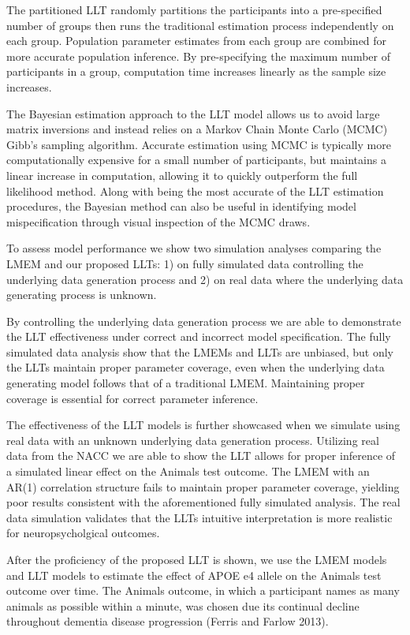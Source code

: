\documentclass[
]{article}
\begin{document}
The partitioned LLT randomly partitions the participants into a pre-specified number of groups then runs the traditional estimation process independently on each group. Population parameter estimates from each group are combined for more accurate population inference. By pre-specifying the maximum number of participants in a group, computation time increases linearly as the sample size increases.

The Bayesian estimation approach to the LLT model allows us to avoid large matrix inversions and instead relies on a Markov Chain Monte Carlo (MCMC) Gibb's sampling algorithm. Accurate estimation using MCMC is typically more computationally expensive for a small number of participants, but maintains a linear increase in computation, allowing it to quickly outperform the full likelihood method. Along with being the most accurate of the LLT estimation procedures, the Bayesian method can also be useful in identifying model mispecification through visual inspection of the MCMC draws.

To assess model performance we show two simulation analyses comparing the LMEM and our proposed LLTs: 1) on fully simulated data controlling the underlying data generation process and 2) on real data where the underlying data generating process is unknown.

By controlling the underlying data generation process we are able to demonstrate the LLT effectiveness under correct and incorrect model specification. The fully simulated data analysis show that the LMEMs and LLTs are unbiased, but only the LLTs maintain proper parameter coverage, even when the underlying data generating model follows that of a traditional LMEM. Maintaining proper coverage is essential for correct parameter inference.

The effectiveness of the LLT models is further showcased when we simulate using real data with an unknown underlying data generation process. Utilizing real data from the NACC we are able to show the LLT allows for proper inference of a simulated linear effect on the Animals test outcome. The LMEM with an AR(1) correlation structure fails to maintain proper parameter coverage, yielding poor results consistent with the aforementioned fully simulated analysis. The real data simulation validates that the LLTs intuitive interpretation is more realistic for neuropsycholgical outcomes.

After the proficiency of the proposed LLT is shown, we use the LMEM models and LLT models to estimate the effect of APOE e4 allele on the Animals test outcome over time. The Animals outcome, in which a participant names as many animals as possible within a minute, was chosen due its continual decline throughout dementia disease progression (Ferris and Farlow 2013).
\end{document}
